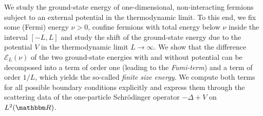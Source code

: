 We study the ground-state energy of one-dimensional, non-interacting fermions 
subject to an external potential in the thermodynamic limit. 
To this end, we fix some (Fermi) energy $\nu>0$, 
confine fermions with total energy below $\nu$ inside the interval $[-L,L]$ 
and study the shift of the ground-state energy due to the
potential $V$ in the thermodynamic limit $L\to\infty$.
We show that the difference $\mathcal{E}_L(\nu)$ of the two ground-state energies with and without
potential can be decomposed into a term
of order one (leading to the \emph{Fumi-term}) and a term of order
$1/L$, which yields the so-called \emph{finite size energy}.
We compute both terms for all possible boundary conditions explicitly and express them
through the scattering data of the one-particle Schr\"odinger operator
$-\Delta +V$ on $L^2(\mathbbm R)$. 

